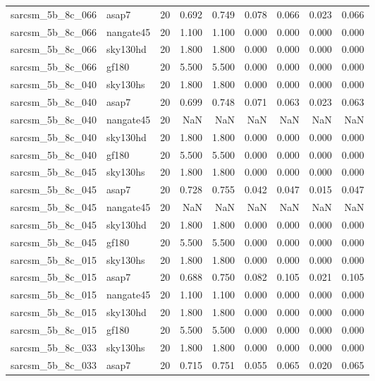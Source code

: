 \begin{tabular}{llrrrrrrr}
sarcsm\_5b\_8c\_066 & asap7 & 20 & 0.692 & 0.749 & 0.078 & 0.066 & 0.023 & 0.066 \\
sarcsm\_5b\_8c\_066 & nangate45 & 20 & 1.100 & 1.100 & 0.000 & 0.000 & 0.000 & 0.000 \\
sarcsm\_5b\_8c\_066 & sky130hd & 20 & 1.800 & 1.800 & 0.000 & 0.000 & 0.000 & 0.000 \\
sarcsm\_5b\_8c\_066 & gf180 & 20 & 5.500 & 5.500 & 0.000 & 0.000 & 0.000 & 0.000 \\
sarcsm\_5b\_8c\_040 & sky130hs & 20 & 1.800 & 1.800 & 0.000 & 0.000 & 0.000 & 0.000 \\
sarcsm\_5b\_8c\_040 & asap7 & 20 & 0.699 & 0.748 & 0.071 & 0.063 & 0.023 & 0.063 \\
sarcsm\_5b\_8c\_040 & nangate45 & 20 & NaN & NaN & NaN & NaN & NaN & NaN \\
sarcsm\_5b\_8c\_040 & sky130hd & 20 & 1.800 & 1.800 & 0.000 & 0.000 & 0.000 & 0.000 \\
sarcsm\_5b\_8c\_040 & gf180 & 20 & 5.500 & 5.500 & 0.000 & 0.000 & 0.000 & 0.000 \\
sarcsm\_5b\_8c\_045 & sky130hs & 20 & 1.800 & 1.800 & 0.000 & 0.000 & 0.000 & 0.000 \\
sarcsm\_5b\_8c\_045 & asap7 & 20 & 0.728 & 0.755 & 0.042 & 0.047 & 0.015 & 0.047 \\
sarcsm\_5b\_8c\_045 & nangate45 & 20 & NaN & NaN & NaN & NaN & NaN & NaN \\
sarcsm\_5b\_8c\_045 & sky130hd & 20 & 1.800 & 1.800 & 0.000 & 0.000 & 0.000 & 0.000 \\
sarcsm\_5b\_8c\_045 & gf180 & 20 & 5.500 & 5.500 & 0.000 & 0.000 & 0.000 & 0.000 \\
sarcsm\_5b\_8c\_015 & sky130hs & 20 & 1.800 & 1.800 & 0.000 & 0.000 & 0.000 & 0.000 \\
sarcsm\_5b\_8c\_015 & asap7 & 20 & 0.688 & 0.750 & 0.082 & 0.105 & 0.021 & 0.105 \\
sarcsm\_5b\_8c\_015 & nangate45 & 20 & 1.100 & 1.100 & 0.000 & 0.000 & 0.000 & 0.000 \\
sarcsm\_5b\_8c\_015 & sky130hd & 20 & 1.800 & 1.800 & 0.000 & 0.000 & 0.000 & 0.000 \\
sarcsm\_5b\_8c\_015 & gf180 & 20 & 5.500 & 5.500 & 0.000 & 0.000 & 0.000 & 0.000 \\
sarcsm\_5b\_8c\_033 & sky130hs & 20 & 1.800 & 1.800 & 0.000 & 0.000 & 0.000 & 0.000 \\
sarcsm\_5b\_8c\_033 & asap7 & 20 & 0.715 & 0.751 & 0.055 & 0.065 & 0.020 & 0.065 \\

\end{tabular}
